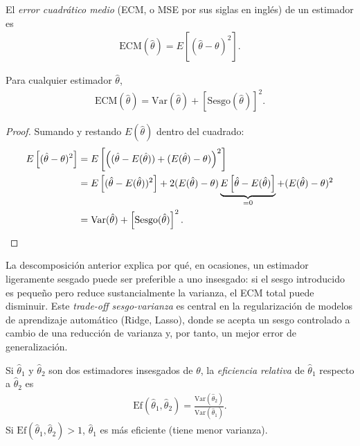 \begin{definicion}
 \label{eq:6.1.2}
El \emph{error cuadrático medio} (ECM, o MSE por sus siglas en inglés) de un estimador es
\begin{align}
 \text{ECM}(\hat{\theta}) = E\left[(\hat{\theta}-\theta)^2\right].
\end{align}
\end{definicion}

\begin{teorema}
 \label{eq:6.1.3}
Para cualquier estimador $\hat{\theta}$,
\begin{align}
 \text{ECM}(\hat{\theta}) = \text{Var}(\hat{\theta}) + \left[\text{Sesgo}(\hat{\theta})\right]^2.
\end{align}
\end{teorema}

\begin{proof}
Sumando y restando $E(\hat{\theta})$ dentro del cuadrado:
\begin{align}
 E\left[(\hat{\theta}-\theta)^2\right] &= E\left[\left((\hat{\theta}-E(\hat{\theta})) + (E(\hat{\theta})-\theta)\right)^2\right] \nonumber \\
 &= E\left[(\hat{\theta}-E(\hat{\theta}))^2\right] + 2(E(\hat{\theta})-\theta)\underbrace{E\left[\hat{\theta}-E(\hat{\theta})\right]}_{=0} + (E(\hat{\theta})-\theta)^2 \nonumber \\
 &= \text{Var}(\hat{\theta}) + \left[\text{Sesgo}(\hat{\theta})\right]^2. \qedhere
\end{align}
\end{proof}

\begin{observacion}
La descomposición anterior explica por qué, en ocasiones, un estimador ligeramente sesgado puede ser preferible a uno insesgado: si el sesgo introducido es pequeño pero reduce sustancialmente la varianza, el ECM total puede disminuir. Este \emph{trade-off sesgo-varianza} es central en la regularización de modelos de aprendizaje automático (Ridge, Lasso), donde se acepta un sesgo controlado a cambio de una reducción de varianza y, por tanto, un mejor error de generalización.
\end{observacion}

\begin{definicion}
 \label{eq:6.1.4}
Si $\hat{\theta}_1$ y $\hat{\theta}_2$ son dos estimadores insesgados de $\theta$, la \emph{eficiencia relativa} de $\hat{\theta}_1$ respecto a $\hat{\theta}_2$ es
\begin{align}
 \text{Ef}(\hat{\theta}_1, \hat{\theta}_2) = \frac{\text{Var}(\hat{\theta}_2)}{\text{Var}(\hat{\theta}_1)}.
\end{align}
Si $\text{Ef}(\hat{\theta}_1,\hat{\theta}_2) > 1$, $\hat{\theta}_1$ es más eficiente (tiene menor varianza).
\end{definicion}

